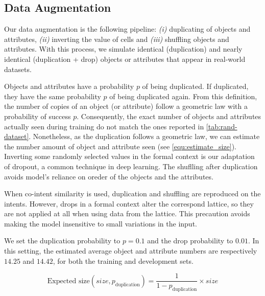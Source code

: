 \subsection{Data Augmentation}\label{sec:augment}
Our data augmentation is the following pipeline: \textit{(i)} duplicating of objects and attributes, \textit{(ii)} inverting the value of cells and \textit{(iii)} shuffling objects and attributes.
With this process, we simulate identical (duplication) and nearly identical (duplication + drop) objects or attributes that appear in real-world datasets.

Objects and attributes have a probability $p$ of being duplicated.
If duplicated, they have the same probability $p$ of being duplicated again.
From this definition, the number of copies of an object (or attribute) follow a geometric law with a probability of success $p$.
Consequently, the exact number of objects and attributes actually seen during training do not match the ones reported in \autoref{tab:rand-dataset}.
Nonetheless, as the duplication follows a geometric law, we can estimate the number amount of object and attribute seen (see \autoref{equ:estimate_size}).
Inverting some randomly selected values in the formal context is our adaptation of dropout, a common technique in deep learning.
The shuflling after duplication avoids model's reliance on oreder of the objects and the attributes.

When co-intent similarity is used, duplication and shuffling are reproduced on the intents.
However, drops in a formal context alter the correspond lattice, so they are not applied at all when using data from the lattice.
This precaution avoids making the model insensitive to small variations in the input.

We set the duplication probability to $p=0.1$ and the drop probability to $0.01$.
In this setting, the estimated average object and attribute numbers are respectively $14.25$ and $14.42$, for both the training and development sets.

\begin{equation}
    \text{Expected size}(size, p_\text{duplication}) = \frac{1}{1 - p_\text{duplication}} \times{} size
    \label{equ:estimate_size}
\end{equation}